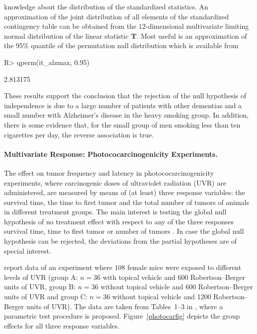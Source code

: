 \documentclass{article}
\newcommand{\T}{\mathbf{T}}
\newenvironment{Schunk}{}{}
\begin{document}
knowledge about the distribution of the standardized statistics. An
approximation of the joint distribution of all elements of the standardized
contingency table can be obtained from the
$12$-dimensional
multivariate limiting normal distribution of the linear statistic $\T$. Most
useful is an approximation of the $95\%$ quantile of the permutation 
null distribution which is available from
\begin{Schunk}
\begin{Sinput}
R> qperm(it_alzmax, 0.95)
\end{Sinput}
\begin{Soutput}
[1] 2.813175
\end{Soutput}
\end{Schunk}
These results support the conclusion that the rejection of the 
null hypothesis of independence is due to a large number of patients
with other dementias and a small number with Alzheimer's disease in the heavy
smoking group. In addition, there is some evidence that, for the small
group of men smoking less than ten cigarettes per day, the reverse
association is true.

\paragraph{Multivariate Response: Photococarcinogenicity Experiments.}

The effect on tumor frequency and latency in photococarcinogenicity
experiments, where carcinogenic doses of ultraviolet radiation (UVR) are
administered, are measured by means of (at least) three response variables:
the survival time, the time to first tumor and the total number of tumors of
animals in different treatment groups. 
The main interest is testing the global null hypothesis of no treatment 
effect with respect to any of the three responses survival time, time to first tumor or
number of tumors \citep[][analyze the detection time
of tumors in addition, this data is not given here]{Molefeetal2005}. 
In case the  global null hypothesis can be rejected, the deviations 
from the partial hypotheses are of special interest.

\cite{Molefeetal2005} report data of an experiment where
$108$ female mice were exposed to different levels 
of UVR (group A: $n = 36$ with topical vehicle and 600 Robertson--Berger units 
of UVR, group B: $n = 36$ without topical vehicle and 600 Robertson--Berger units of UVR and group C: 
$n = 36$ without topical vehicle and 1200 Robertson--Berger units of UVR). 
The data are taken from Tables~1--3 in \cite{Molefeetal2005}, where a 
parametric test procedure is proposed.  Figure~\ref{photocarfig} depicts
the group effects for all three response variables. 
\end{document}
